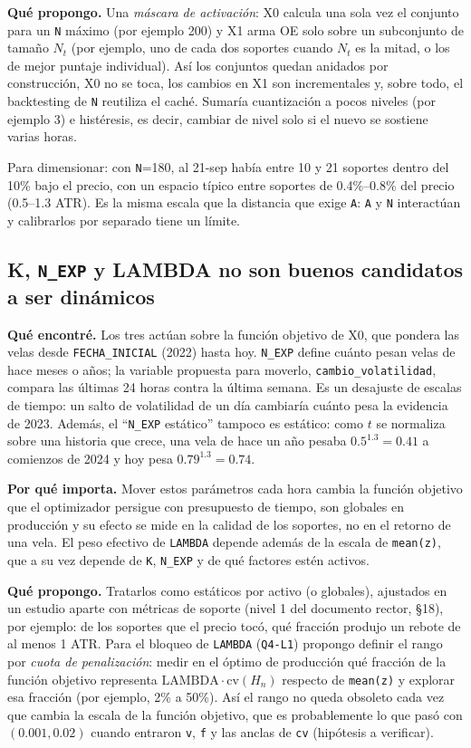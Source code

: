 \documentclass[11pt,a4paper]{article}
\newcommand{\code}[1]{\texttt{\small #1}}
\begin{document}
\textbf{Qué propongo.} Una \emph{máscara de activación}: X0 calcula una sola vez el conjunto para un
\code{N} máximo (por ejemplo 200) y X1 arma OE solo sobre un subconjunto de tamaño $N_t$ (por ejemplo, uno
de cada dos soportes cuando $N_t$ es la mitad, o los de mejor puntaje individual). Así los conjuntos
quedan anidados por construcción, X0 no se toca, los cambios en X1 son incrementales y, sobre todo, el
backtesting de \code{N} reutiliza el caché. Sumaría cuantización a pocos niveles (por ejemplo 3) e
histéresis, es decir, cambiar de nivel solo si el nuevo se sostiene varias horas.

Para dimensionar: con \code{N}=180, al 21-sep había entre 10 y 21 soportes dentro del 10\% bajo el precio, con
un espacio típico entre soportes de 0.4\%--0.8\% del precio (0.5--1.3 ATR). Es la misma escala que la
distancia que exige \code{A}: \code{A} y \code{N} interactúan y calibrarlos por separado tiene un límite.

\subsection{\texorpdfstring{K, \code{N\_EXP} y LAMBDA}{K, N_EXP y LAMBDA} no son buenos candidatos a ser dinámicos}\label{sec:x0}

\textbf{Qué encontré.} Los tres actúan sobre la función objetivo de X0, que pondera las velas desde
\code{FECHA\_INICIAL} (2022) hasta hoy. \code{N\_EXP} define cuánto pesan velas de hace meses o años;
la variable propuesta para moverlo, \code{cambio\_volatilidad}, compara las últimas 24 horas contra la
última semana. Es un desajuste de escalas de tiempo: un salto de volatilidad de un día cambiaría cuánto
pesa la evidencia de 2023. Además, el ``\code{N\_EXP} estático'' tampoco es estático: como $t$ se
normaliza sobre una historia que crece, una vela de hace un año pesaba $0.5^{1.3}=0.41$ a comienzos de
2024 y hoy pesa $0.79^{1.3}=0.74$.

\textbf{Por qué importa.} Mover estos parámetros cada hora cambia la función objetivo que el optimizador
persigue con presupuesto de tiempo, son globales en producción y su efecto se mide en la calidad de los
soportes, no en el retorno de una vela. El peso efectivo de \code{LAMBDA} depende además de la escala de
\code{mean(z)}, que a su vez depende de \code{K}, \code{N\_EXP} y de qué factores estén activos.

\textbf{Qué propongo.} Tratarlos como estáticos por activo (o globales), ajustados en un estudio aparte
con métricas de soporte (nivel 1 del documento rector, §18), por ejemplo: de los soportes que el precio
tocó, qué fracción produjo un rebote de al menos 1 ATR. Para el bloqueo de \code{LAMBDA} (\code{Q4-L1})
propongo definir el rango por \emph{cuota de penalización}: medir en el óptimo de producción qué fracción
de la función objetivo representa $\text{LAMBDA}\cdot\text{cv}(H_n)$ respecto de \code{mean(z)} y explorar
esa fracción (por ejemplo, 2\% a 50\%). Así el rango no queda obsoleto cada vez que cambia la escala de la
función objetivo, que es probablemente lo que pasó con $(0.001, 0.02)$ cuando entraron \code{v}, \code{f}
y las anclas de \code{cv} (hipótesis a verificar).
\end{document}
